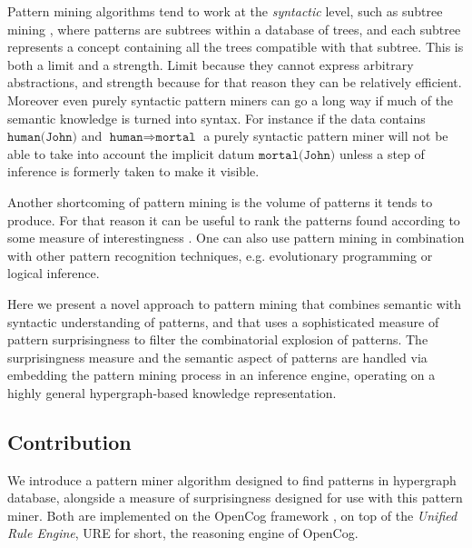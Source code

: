 \documentclass[runningheads]{llncs}
\begin{document}
Pattern mining algorithms tend to work at the \emph{syntactic} level,
such as subtree mining \cite{Chi2005Freq}, where patterns are subtrees
within a database of trees, and each subtree represents a concept
containing all the trees compatible with that subtree. This is both a
limit and a strength. Limit because they cannot express arbitrary
abstractions, and strength because for that reason they can be
relatively efficient. Moreover even purely syntactic pattern miners
can go a long way if much of the semantic knowledge is turned into
syntax. For instance if the data contains $\texttt{human(John)}$ and
$\texttt{human}\Rightarrow\texttt{mortal}$ a purely syntactic pattern
miner will not be able to take into account the implicit datum
$\texttt{mortal(John)}$ unless a step of inference is formerly taken
to make it visible.

Another shortcoming of pattern mining is the volume of patterns it
tends to produce. For that reason it can be useful to rank the patterns found
according to some measure of interestingness \cite{Vreeken2014}.  One can
also use pattern mining in combination with other pattern recognition techniques,
e.g. evolutionary programming or logical inference.

Here we present a novel approach to pattern mining that combines semantic
with syntactic understanding of patterns, and that uses a sophisticated
measure of pattern surprisingness to filter the combinatorial explosion of
patterns.   The surprisingness measure and the semantic aspect of patterns
are handled via embedding the pattern mining process in an inference engine,
operating on a highly general hypergraph-based knowledge representation.

\subsection{Contribution}

We introduce a pattern miner algorithm designed to find patterns in
hypergraph database, alongside a measure of surprisingness designed
for use with this pattern miner. Both are implemented on the OpenCog
framework \cite{Goertzel2014EGI2}, on top of the \emph{Unified Rule
  Engine}, URE for short, the reasoning engine of OpenCog.
\end{document}
